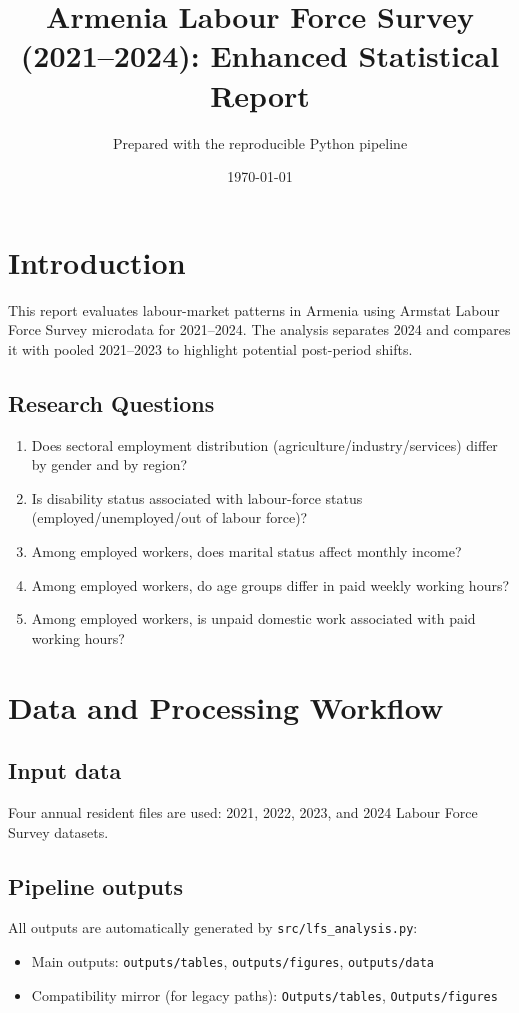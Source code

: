 \documentclass[12pt]{article}
\title{Armenia Labour Force Survey (2021--2024): Enhanced Statistical Report}
\author{Prepared with the reproducible Python pipeline}
\date{\today}
\begin{document}
\maketitle
\tableofcontents
\newpage

\section{Introduction}
This report evaluates labour-market patterns in Armenia using Armstat Labour Force Survey microdata for 2021--2024. The analysis separates 2024 and compares it with pooled 2021--2023 to highlight potential post-period shifts.

\subsection*{Research Questions}
\begin{enumerate}
    \item Does sectoral employment distribution (agriculture/industry/services) differ by gender and by region?
    \item Is disability status associated with labour-force status (employed/unemployed/out of labour force)?
    \item Among employed workers, does marital status affect monthly income?
    \item Among employed workers, do age groups differ in paid weekly working hours?
    \item Among employed workers, is unpaid domestic work associated with paid working hours?
\end{enumerate}

\section{Data and Processing Workflow}
\subsection{Input data}
Four annual resident files are used: 2021, 2022, 2023, and 2024 Labour Force Survey datasets.

\subsection{Pipeline outputs}
All outputs are automatically generated by \texttt{src/lfs\_analysis.py}:
\begin{itemize}
    \item Main outputs: \texttt{outputs/tables}, \texttt{outputs/figures}, \texttt{outputs/data}
    \item Compatibility mirror (for legacy paths): \texttt{Outputs/tables}, \texttt{Outputs/figures}
\end{itemize}
\end{document}
